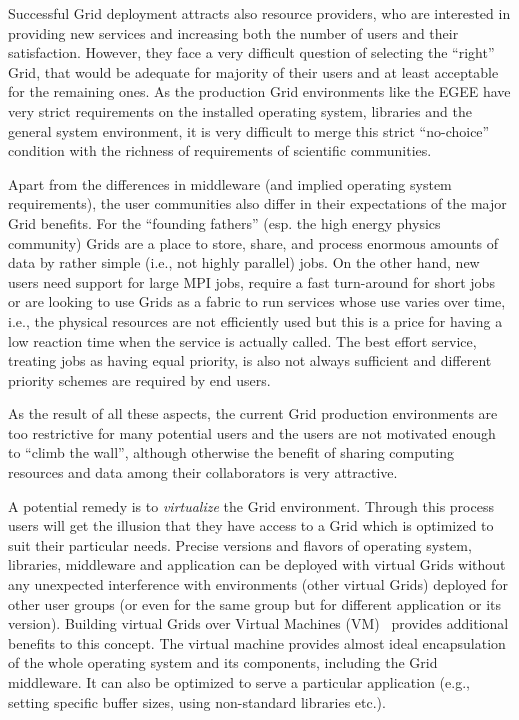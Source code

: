 \documentclass[a4paper]{article}
\begin{document}
Successful Grid deployment attracts also resource providers, who are
interested in providing new services and increasing both the number of users
and their satisfaction. However, they face a very difficult question of
selecting the ``right'' Grid, that would be adequate for majority of their
users and at least acceptable for the remaining ones. As the production Grid
environments like the EGEE have very strict requirements on the installed
operating system, libraries and the general system environment, it is very
difficult to merge this strict ``no-choice'' condition with the richness of
requirements of scientific communities. 

Apart from the differences in middleware (and implied operating system
requirements), the user communities also differ in their expectations of the
major Grid benefits. For the ``founding fathers'' (esp. the high energy
physics community) Grids are a place to store, share, and process enormous
amounts of data by rather simple (i.e., not highly parallel) jobs. On the
other hand, new users need support for large MPI jobs, require a fast
turn-around for short jobs or are looking to use Grids as a fabric to run
services whose use varies over time, i.e., the physical resources are not
efficiently used but this is a price for having a low reaction time when the
service is actually called. The best effort service, treating jobs as having
equal priority, is also not always sufficient and different priority schemes
are required by end users.

As the result of all these aspects, the current Grid production environments
are too restrictive for many potential users and the users are not motivated
enough to ``climb the wall'', although otherwise the benefit of sharing
computing resources and data among their collaborators is very attractive.

A potential remedy is to \emph{virtualize} the Grid environment. Through this
process users will get the illusion that they have access to a Grid which is
optimized to suit their particular needs. Precise versions and flavors of
operating system, libraries, middleware and application can be deployed with
virtual Grids without any unexpected interference with environments (other
virtual Grids) deployed for other user groups (or even for the same group but
for different application or its version). Building virtual Grids over Virtual
Machines (VM)~\cite{vmms} provides additional benefits to this concept. The
virtual machine provides almost ideal encapsulation of the whole operating
system and its components, including the Grid middleware. It can also be
optimized to serve a particular application (e.g., setting specific buffer
sizes, using non-standard libraries etc.).
\end{document}
